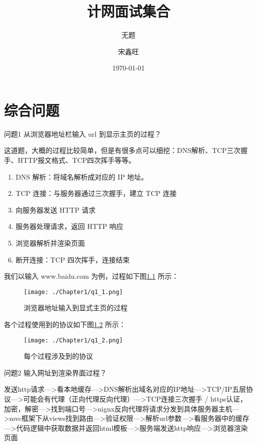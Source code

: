 \documentclass[cn,11pt,color=blue,lang=cn]{elegantbook}
\title{计网面试集合}
\subtitle{无题}
\author{宋鑫旺}
\institute{CoderHub}
\date{\today}
\begin{document}
	

\maketitle
\tableofcontents


\mainmatter
\hypersetup{pageanchor=true}

\chapter{综合问题}

\begin{custom}{问题1}
从浏览器地址栏输入 url 到显示主页的过程？
\end{custom}

\begin{solution}
这道题，大概的过程比较简单，但是有很多点可以细挖：DNS解析、TCP三次握手、HTTP报文格式、TCP四次挥手等等。
\begin{enumerate}
\item DNS 解析：将域名解析成对应的 IP 地址。
\item TCP 连接：与服务器通过三次握手，建立 TCP 连接
\item 向服务器发送 HTTP 请求
\item 服务器处理请求，返回 HTTP 响应
\item 浏览器解析并渲染页面
\item 断开连接：TCP 四次挥手，连接结束
\end{enumerate}

我们以输入 www.baidu.com 为例，过程如下图\ref{fig1_1} 所示：
\begin{figure}[htbp]
\centering
\texttt{[image: ./Chapter1/q1\_1.png]}
\caption{浏览器地址输入到显式主页的过程}
\label{fig1_1}
\end{figure}

各个过程使用到的协议如下图\ref{fig1_2} 所示：
\begin{figure}[htbp]
\centering
\texttt{[image: ./Chapter1/q1\_2.png]}
\caption{每个过程涉及到的协议}
\label{fig1_2}
\end{figure}
\end{solution}

\begin{custom}{问题2}
输入网址到渲染界面过程？
\end{custom}
\begin{solution}
发送http请求--->看本地缓存--->DNS解析出域名对应的IP地址--->TCP/IP五层协议--->可能会有代理（正向代理反向代理）--->TCP连接三次握手 / https认证，加密，解密--->找到端口号--->nignx反向代理将请求分发到具体服务器主机--->mvc框架下从views找到路由--->验证权限--->解析url参数--->看服务器中的缓存--->代码逻辑中获取数据并返回html模板--->服务端发送http响应--->浏览器渲染页面
\end{solution}
\end{document}

